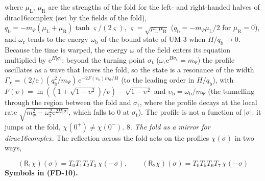 \documentclass[
  10pt,
]{article}
\begin{document}
where \(\mu_{\mathrm{L}}\), \(\mu_{\mathrm{R}}\) are the strengths of
the fold for the left- and right-handed halves of dirac16complex (set by
the fields of the fold),
\(q_{\mathrm{b}} = -m_\Psi(\mu_{\mathrm{L}} + \mu_{\mathrm{R}})\tanh\varsigma/(2\varsigma)\),
\(\varsigma = \sqrt{\mu_{\mathrm{L}}\mu_{\mathrm{R}}}\)
(\(q_{\mathrm{b}} = -m_\Psi\mu_{\mathrm{L}}/2\) for
\(\mu_{\mathrm{R}} = 0\)), and \(\omega_{\mathrm{r}}\) tends to the
energy \(\omega_{\mathrm{b}}\) of the bound state of UM-3 when
\(H/q_{\mathrm{b}} \to 0\). Because the time is warped, the energy
\(\omega\) of the field enters its equation multiplied by
\(\mathrm{e}^{H\lvert\sigma\rvert}\): beyond the turning point
\(\sigma_{\mathrm{t}}\)
(\(\omega_{\mathrm{r}}\mathrm{e}^{H\sigma_{\mathrm{t}}} = m_\Psi\)) the
profile oscillates as a wave that leaves the fold, so the state is a
resonance of the width
\(\Gamma_\chi = (2/\mathrm{e})(q_{\mathrm{b}}^2/m_\Psi)\,\mathrm{e}^{-2F(\upsilon_{\mathrm{b}})m_\Psi/H}\)
(to the leading order in \(H/q_{\mathrm{b}}\)), with
\(F(\upsilon) = \ln((1 + \sqrt{1 - \upsilon^2})/\upsilon) - \sqrt{1 - \upsilon^2}\)
and \(\upsilon_{\mathrm{b}} = \omega_{\mathrm{b}}/m_\Psi\) (the
tunnelling through the region between the fold and
\(\sigma_{\mathrm{t}}\), where the profile decays at the local rate
\(\sqrt{m_\Psi^2 - \omega_{\mathrm{r}}^2\mathrm{e}^{2H\lvert\sigma\rvert}}\),
which falls to 0 at \(\sigma_{\mathrm{t}}\)). The profile is not a
function of \(\lvert\sigma\rvert\): it jumps at the fold,
\(\chi(0^+) \ne \chi(0^-)\). 8. \emph{The fold as a mirror for
dirac16complex.} The reflection across the fold acts on the profiles
\(\chi(\sigma)\) in two ways,

\[
(\mathsf{R}_1\chi)(\sigma) = T_0T_1T_2T_3\,\chi(-\sigma),\qquad (\mathsf{R}_2\chi)(\sigma) = T_0T_5T_6T_7\,\chi(-\sigma) \tag{FD-10}
\] \textbf{Symbols in (FD-10).}
\end{document}
